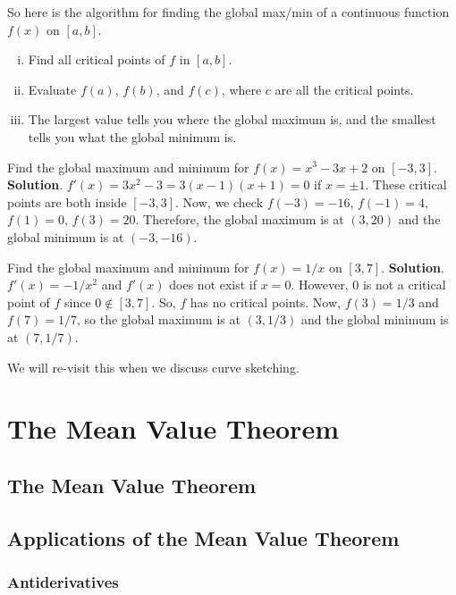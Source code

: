So here is the algorithm for finding the global max/min
of a continuous function $ f(x) $ on $ [a,b] $.
\begin{enumerate}[(i)]
    \item Find all critical points of $ f $ in $ [a,b] $.
    \item Evaluate $ f(a) $, $ f(b) $, and $ f(c) $, where $ c $ are all the critical points.
    \item The largest value tells you where the global maximum is, and the smallest tells you what the global minimum is.
\end{enumerate}
\begin{Example}{}{}
    Find the global maximum and minimum for $ f(x)=x^3-3x+2 $ on $ [-3,3] $.
    \tcblower{}
    \textbf{Solution}. $ f'(x)=3x^2-3=3(x-1)(x+1)=0 $ if $ x=\pm 1 $.
    These critical points are both inside $ [-3,3] $. Now, we check
    $ f(-3)=-16 $, $ f(-1)=4 $, $ f(1)=0 $, $ f(3)=20 $. Therefore, the global maximum is at $ (3,20) $ and
    the global minimum is at $ (-3,-16) $.
\end{Example}
\begin{Example}{}{}
    Find the global maximum and minimum for $ f(x)=1/x $ on $ [3,7] $.
    \tcblower{}
    \textbf{Solution}. $ f'(x)=-1/x^2 $ and $ f'(x) $ does not exist if $ x=0 $.
    However, $ 0 $ is not a critical point of $ f $ since $ 0\notin [3,7] $.
    So, $ f $ has no critical points. Now, $ f(3)=1/3 $ and $ f(7)=1/7 $, so
    the global maximum is at $ (3,1/3) $ and the global minimum is at $ (7,1/7) $.
\end{Example}
We will re-visit this when we discuss curve sketching.

\chapter{The Mean Value Theorem}
\section{The Mean Value Theorem}
\section{Applications of the Mean Value Theorem}
\subsection{Antiderivatives}
